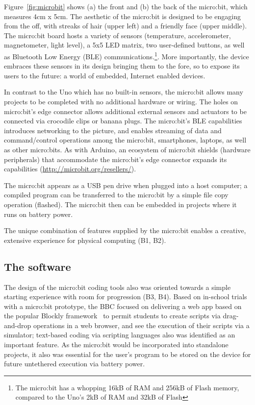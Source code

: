 Figure~\ref{fig:microbit} shows (a) the front and (b) the back of the
micro:bit, which measures 4cm x 5cm. The aesthetic of the micro:bit is designed to be engaging from the off, with streaks of hair (upper left) and a friendly face (upper middle).
The micro:bit board hosts a variety of sensors (temperature, accelerometer, magnetometer,
light level), a 5x5 LED matrix, two user-defined buttons, as well as Bluetooth
Low Energy (BLE) communications.\footnote{The micro:bit has a whopping
16kB of RAM and 256kB of Flash memory, compared to the Uno's 2kB of
RAM and 32kB of Flash}. More importantly, the device embraces these sensors in its design bringing them to the fore, so to expose its users to the future: a world of embedded, Internet enabled devices.

In contrast to the Uno which has no built-in sensors, the micro:bit
allows many projects to be completed with no additional hardware or wiring.
The holes on micro:bit's edge connector allows additional external sensors and actuators to be connected via crocodile clips or banana plugs.
The micro:bit's BLE capabilities introduces networking to the
picture, and enables streaming of data and command/control operations among the micro:bit,
smartphones, laptops, as well as other micro:bits.
As with Arduino, an ecosystem of micro:bit shields
(hardware peripherals) that accommodate the micro:bit's edge
connector expands its capabilities (\url{http://microbit.org/resellers/}).

The micro:bit appears as a USB pen drive when plugged into a host computer;
a compiled program can be transferred to the micro:bit by a simple file copy
operation (flashed). The micro:bit then can be embedded in projects
where it runs on battery power.

The unique combination of features supplied by the micro:bit enables a creative,
extensive experience for physical computing (B1, B2).

\subsection{The software}

The design of the micro:bit coding tools also was oriented towards a
simple starting experience with room for progression (B3, B4). Based on in-school trials with a micro:bit prototype, the BBC focused on delivering a web app
based on the popular Blockly framework~\cite{Blocky2015} to permit students to
create scripts via drag-and-drop operations in a web browser, and see
the execution of their scripts via a simulator; text-based coding via scripting languages also
was identified as an important feature. As the micro:bit would be incorporated
into standalone projects, it also was essential for the user's program to be stored on the device for future untethered execution via battery power.

